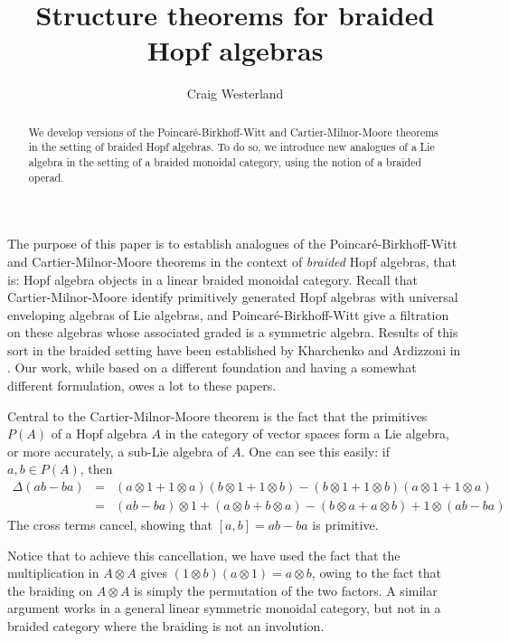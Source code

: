 \documentclass[12pt]{article}
\title{Structure theorems for braided Hopf algebras}
\author{Craig Westerland}
\theoremstyle{plain}
\theoremstyle{definition}
\theoremstyle{remark}
\begin{document}


\maketitle
\begin{abstract} We develop versions of the Poincar\'{e}-Birkhoff-Witt and Cartier-Milnor-Moore theorems in the setting of braided Hopf algebras.  To do so, we introduce new analogues of a Lie algebra in the setting of a braided monoidal category, using the notion of a braided operad. \end{abstract}

The purpose of this paper is to establish analogues of the Poincar\'{e}-Birkhoff-Witt and Cartier-Milnor-Moore theorems \cite{cartier_62, milnor-moore} in the context of \emph{braided} Hopf algebras, that is: Hopf algebra objects in a linear braided monoidal category.  Recall that Cartier-Milnor-Moore identify primitively generated Hopf algebras with universal enveloping algebras of Lie algebras, and Poincar\'{e}-Birkhoff-Witt give a filtration on these algebras whose associated graded is a symmetric algebra.  Results of this sort in the braided setting have been established by Kharchenko and Ardizzoni in \cite{kharchenko, ardizzoni_mm, ardizzoni_prim_gen, ardizzoni_glasgow}.  Our work, while based on a different foundation and having a somewhat different formulation, owes a lot to these papers.

Central to the Cartier-Milnor-Moore theorem is the fact that the primitives $P(A)$ of a Hopf algebra $A$ in the category of vector spaces form a Lie algebra, or more accurately, a sub-Lie algebra of $A$.  One can see this easily: if $a, b \in P(A)$, then 
%
\begin{eqnarray*}
\Delta(ab-ba) & = & (a \otimes 1 + 1 \otimes a)(b \otimes 1 +1 \otimes b) - (b \otimes 1 +1 \otimes b)(a \otimes 1 + 1 \otimes a) \\
 & = & (ab-ba) \otimes 1 + (a \otimes b + b \otimes a) - (b \otimes a + a \otimes b) + 1 \otimes (ab -ba) 
\end{eqnarray*}
%
The cross terms cancel, showing that $[a, b] = ab-ba$ is primitive.  

Notice that to achieve this cancellation, we have used the fact that the multiplication in $A \otimes A$ gives $(1 \otimes b) (a \otimes 1) = a \otimes b$, owing to the fact that the braiding on $A \otimes A$ is simply the permutation of the two factors.  A similar argument works in a general linear symmetric monoidal category, but not in a braided category where the braiding is not an involution.
\end{document}
